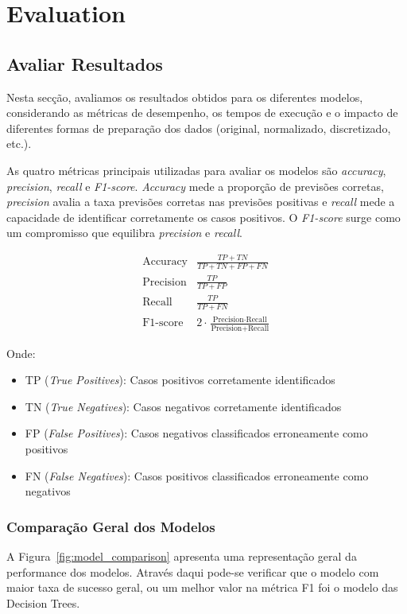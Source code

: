 \chapter{Evaluation}
\label{chap:ev}

\section{Avaliar Resultados}
\label{chap:ev:results}

Nesta secção, avaliamos os resultados obtidos para os diferentes modelos, considerando as métricas de desempenho, os tempos de execução e o impacto de diferentes formas de preparação dos dados (original, normalizado, discretizado, etc.).

As quatro métricas principais utilizadas para avaliar os modelos são \textit{accuracy}, \textit{precision}, \textit{recall} e \textit{F1-score}. \textit{Accuracy} mede a proporção de previsões corretas, \textit{precision} avalia a taxa previsões corretas nas previsões positivas e \textit{recall} mede a capacidade de identificar corretamente os casos positivos. O \textit{F1-score} surge como um compromisso que equilibra \textit{precision} e \textit{recall}.

\[
\begin{array}{ll}
\text{Accuracy} & \displaystyle \frac{TP + TN}{TP + TN + FP + FN} \\[2ex]
\text{Precision} & \displaystyle \frac{TP}{TP + FP} \\[2ex]
\text{Recall} & \displaystyle \frac{TP}{TP + FN} \\[2ex]
\text{F1-score} & \displaystyle 2 \cdot \frac{\text{Precision} \cdot \text{Recall}}{\text{Precision} + \text{Recall}}
\end{array}
\]

\noindent Onde:
\begin{itemize}
    \item TP (\textit{True Positives}): Casos positivos corretamente identificados
    \item TN (\textit{True Negatives}): Casos negativos corretamente identificados
    \item FP (\textit{False Positives}): Casos negativos classificados erroneamente como positivos
    \item FN (\textit{False Negatives}): Casos positivos classificados erroneamente como negativos
\end{itemize}


\subsection{Comparação Geral dos Modelos}
A Figura~\ref{fig:model_comparison} apresenta uma representação geral da performance dos modelos. Através daqui pode-se verificar que o modelo com maior taxa de sucesso geral, ou um melhor valor na métrica F1 foi o modelo das Decision Trees.

